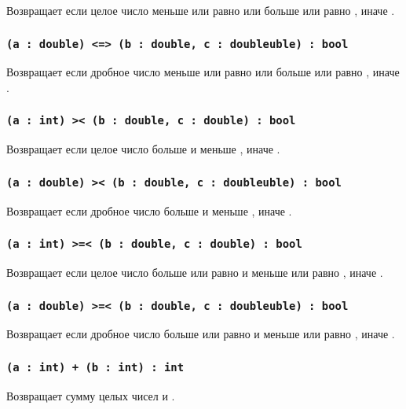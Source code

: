 Возвращает \true{} если целое число  меньше или равно  или больше или равно , иначе \false{}.

\subsubsection{\lstinline|(a : double) <=> (b : double, c : doubleuble) : bool|}

Возвращает \true{} если дробное число  меньше или равно  или больше или равно , иначе \false{}.

\subsubsection{\lstinline|(a : int) >< (b : double, c : double) : bool|}

Возвращает \true{} если целое число  больше  и меньше , иначе \false{}.

\subsubsection{\lstinline|(a : double) >< (b : double, c : doubleuble) : bool|}

Возвращает \true{} если дробное число  больше  и меньше , иначе \false{}.

\subsubsection{\lstinline|(a : int) >=< (b : double, c : double) : bool|}

Возвращает \true{} если целое число  больше или равно  и меньше или равно , иначе \false{}.

\subsubsection{\lstinline|(a : double) >=< (b : double, c : doubleuble) : bool|}

Возвращает \true{} если дробное число  больше или равно  и меньше или равно , иначе \false{}.


\subsubsection{\lstinline|(a : int) + (b : int) : int|}

Возвращает сумму целых чисел  и .

